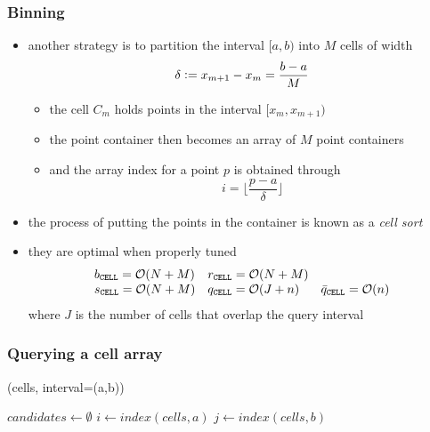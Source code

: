 \begin{frame}[fragile]
%
  \frametitle{Binning}
%
  \begin{itemize}
%
  \item another strategy is to partition the interval $[a,b)$ into $M$ cells of width
    \[
    \delta \mathrel{\mathop:}= x_{m+1} - x_{m} = \frac{b-a}{M}
    \]
    \begin{itemize}
    \item the  cell $C_{m}$ holds points in the interval $[x_{m}, x_{m+1})$
    \item the point container then becomes an array of $M$ point containers
    \item and the array index for a point $p$ is obtained through
      \[
      i = \lfloor \frac{p-a}{\delta} \rfloor
      \]
    \end{itemize}
%
  \item the process of putting the points in the container is known as a {\em cell sort}
%
  \item they are optimal when properly tuned
      \begin{equation*}
        \begin{array}{lll}
          b_{{\tt CELL}} = \mbox{$\mathcal{O}(N + M)$} &
          r_{{\tt CELL}} = \mbox{$\mathcal{O}(N + M)$} \\
          s_{{\tt CELL}} = \mbox{$\mathcal{O}(N + M)$} &
          q_{{\tt CELL}} = \mbox{$\mathcal{O}(J + n)$} &
          \bar{q}_{{\tt CELL}} = \mbox{$\mathcal{O}(n)$}
        \end{array}
      \end{equation*}
      where $J$ is the number of cells that overlap the query interval
%
  \end{itemize}
%
\end{frame}

\begin{frame}[fragile]
%
  \frametitle{Querying a cell array}
%
  \begin{center}
    \begin{minipage}{.85\linewidth}
      \begin{algorithm}[H]
        \label{alg:rq-cell}
%
        \dontprintsemicolon
        \setalcaphskip{0ex}
%
        \caption{\rqcell(cells, interval=(a,b))}
        \vspace{.5em}
%
        $candidates \leftarrow \emptyset$ \;
        $i \leftarrow index(cells, a)$ \;
        $j \leftarrow index(cells, b)$ \;
%
      \end{algorithm}
    \end{minipage}
  \end{center}
%
\end{frame}

